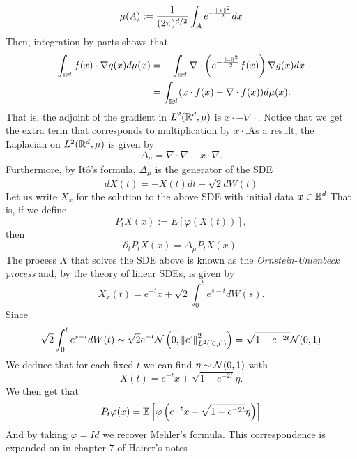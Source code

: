 \documentclass[
    a4paper,
    DIV=14,
    abstract=true,
    numbers=noenddot
]{scrartcl}
\begin{document}
	\begin{equation*}
	\mu(A) := \frac{1}{(2\pi)^{d/2}} \int_{A} e^{-\frac{\left\lVert x \right\rVert^2}{2}} dx
	\end{equation*}
	Then, integration by parts shows that
	\begin{align*}
		\int_{\mathbb{R}^d}f(x) \cdot \nabla g(x) d\mu(x) & =-\int_{\mathbb{R}^d}\nabla\cdot  \left(e^{-\frac{\left\lVert x \right\rVert^2}{2} }f(x)\right) \nabla g(x) dx \\&=\int_{\mathbb{R}^d}(x\cdot f(x)-\nabla\cdot f(x)) d\mu (x).
	\end{align*}
	That is, the adjoint of the gradient in $L^2(\mathbb{R}^d,\mu )$ is $x\cdot -\nabla\cdot $. Notice that we get the extra term that corresponds to multiplication by $x\cdot $.As a result, the Laplacian on $L^2(\mathbb{R}^d, \mu )$ is given by
	\begin{equation*}
		\Delta_\mu =\nabla\cdot \nabla-x\cdot \nabla .
	\end{equation*}
	Furthermore, by Itô's formula, $\Delta_\mu $ is the generator of the SDE
	\begin{equation*}
		dX(t)=-X(t)d t+ \sqrt{2}dW(t)
	\end{equation*}
	Let us write $X_x$ for the solution to the above SDE with initial data  $x \in \mathbb{R}^d$
	That is, if we define $$P_tX(x):=E[\varphi(X(t))],$$ then
	\begin{equation*}
		\partial _tP_tX(x)=\Delta_\mu P_tX(x) .
	\end{equation*}
	The process $X$ that solves the SDE above is known as the \emph{Ornstein-Uhlenbeck process} and, by the theory of linear SDEs, is given by
	\begin{equation*}
		X_x(t)=e^{-t}x+\sqrt{2} \int_{0}^te^{s-t} dW(s).
	\end{equation*}
	Since
	\begin{equation*}
		\sqrt{2} \int_{0}^te^{s-t} dW(t)\sim \sqrt{2} e^{-t}\mathcal{N}\left(0,\left\lVert e^\cdot  \right\rVert^2_{L^2([0,t])}\right)=\sqrt{1-e^{-2t}}\mathcal{N}(0,1)
	\end{equation*}
	We deduce that for each fixed $t$ we can find $\eta  \sim \mathcal{N}(0,1)$ with
	\begin{equation*}
		X(t)=e^{-t}x+\sqrt{1-e^{-2t}}\eta .
	\end{equation*}
	We then get that
	\begin{equation*}
		P_t \varphi(x)=\mathbb{E}\left[\varphi\left(e^{-t}x+\sqrt{1-e^{-2t}}\eta  \right)\right]
	\end{equation*}
	And by taking $\varphi=Id$ we recover Mehler's formula. This correspondence is expanded on in chapter $7$ of Hairer's notes \cite{hairer2009introduction}.


\end{document}
